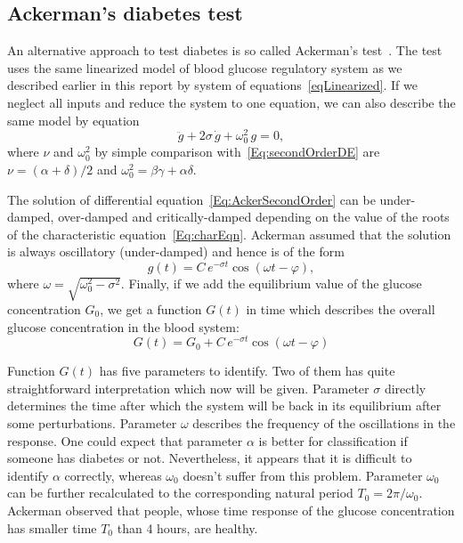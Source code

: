 \documentclass{article}
\begin{document}
\subsection{Ackerman's diabetes test}
An alternative approach to test diabetes is so called Ackerman's test~\cite{braun_differential_1983}. The test uses the same linearized model of blood glucose regulatory system as we described earlier in this report by system of equations~\eqref{eqLinearized}. If we neglect all inputs and reduce the system to one equation, we can also describe the same model by equation
\begin{equation}
	\label{Eq:AckerSecondOrder}
	\ddot g+2\sigma\,\dot g+\omega_0^2\,g=0,
\end{equation}
where $\nu$ and $\omega_0^2$ by simple comparison with~\eqref{Eq:secondOrderDE} are $\nu = (\alpha+\delta)/2$ and $\omega_0^2 = \beta\gamma+\alpha\delta$.

The solution of differential equation~\eqref{Eq:AckerSecondOrder} can be under-damped, over-damped and critically-damped depending on the value of the roots of the characteristic equation~\eqref{Eq:charEqn}. Ackerman assumed that the solution is always oscillatory (under-damped) and hence is of the form
\begin{equation}
	g(t) = C\,e^{-\sigma t}\cos ( \omega t  - \varphi),
\end{equation}
where $\omega = \sqrt{\omega_0^2- \sigma^2}$. Finally, if we add the equilibrium value of the glucose concentration $G_0$, we get a function $G(t)$ in time which describes the overall glucose concentration in the blood system:
\begin{equation}
	\label{Eq:GT}
	G(t) = G_0 + C\,e^{-\sigma t}\cos ( \omega t  - \varphi)
\end{equation}

Function $G(t)$ has five parameters to identify. Two of them has quite straightforward interpretation which now will be given. Parameter $\sigma$ directly determines the time after which the system will be back in its equilibrium after some perturbations. Parameter $\omega$ describes the frequency of the oscillations in the response. One could expect that parameter $\alpha$ is better for classification if someone has diabetes or not. Nevertheless, it appears that it is difficult to identify $\alpha$ correctly, whereas $\omega_0$ doesn't suffer from this problem. Parameter $\omega_0$ can be further recalculated to the corresponding natural period $T_0=2\pi/\omega_0$. Ackerman observed that people, whose time response of the glucose concentration has smaller time 
$T_0$ than 4 hours, are healthy.
\end{document}
